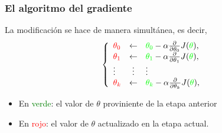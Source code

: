 \documentclass[aspectratio=169]{beamer}
\begin{document}
\begin{frame}\frametitle{El algoritmo del gradiente}
La modificación se hace de manera simultánea, es decir,
$$\left\{\begin{array}{lcl}
\textcolor{red}{\theta_0}&\leftarrow &\textcolor{green}{\theta_0}-\alpha\frac{\partial}{\partial \theta_0}J(\textcolor{green}{\theta}),\\
\textcolor{red}{\theta_1}&\leftarrow &\textcolor{green}{\theta_1}-\alpha\frac{\partial}{\partial \theta_1}J(\textcolor{green}{\theta}),\\
\vdots&\vdots&\vdots\\
\textcolor{red}{\theta_k}&\leftarrow &\textcolor{green}{\theta_k}-\alpha\frac{\partial}{\partial \theta_k}J(\textcolor{green}{\theta}),\\
\end{array}\right.$$

\begin{itemize}
\item En \textcolor{green}{verde}: el valor de $\theta$ proviniente de la etapa anterior
\item  En \textcolor{red}{rojo}: el valor de $\theta$ actualizado en la etapa actual.
\end{itemize}

\end{frame}
\end{document}
